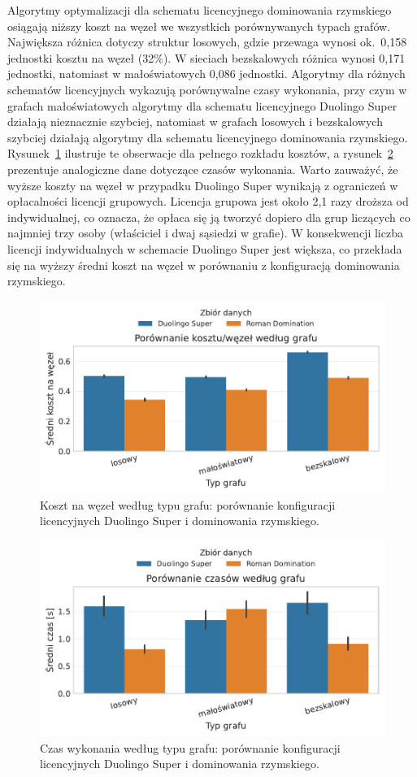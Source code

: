 Algorytmy optymalizacji dla schematu licencyjnego dominowania rzymskiego osiągają niższy koszt na węzeł we wszystkich porównywanych typach grafów. Największa różnica dotyczy struktur losowych, gdzie przewaga wynosi ok.~0{,}158 jednostki kosztu na węzeł (32\%). W sieciach bezskalowych różnica wynosi 0{,}171 jednostki, natomiast w małoświatowych 0{,}086 jednostki. Algorytmy dla różnych schematów licencyjnych wykazują porównywalne czasy wykonania, przy czym w grafach małoświatowych algorytmy dla schematu licencyjnego Duolingo Super działają nieznacznie szybciej, natomiast w grafach losowych i bezskalowych szybciej działają algorytmy dla schematu licencyjnego dominowania rzymskiego. Rysunek~\ref{fig:duo-roman-cost} ilustruje te obserwacje dla pełnego rozkładu kosztów, a rysunek~\ref{fig:duo-roman-time} prezentuje analogiczne dane dotyczące czasów wykonania. Warto zauważyć, że wyższe koszty na węzeł w przypadku Duolingo Super wynikają z ograniczeń w opłacalności licencji grupowych. Licencja grupowa jest około 2{,}1 razy droższa od indywidualnej, co oznacza, że opłaca się ją tworzyć dopiero dla grup liczących co najmniej trzy osoby (właściciel i dwaj sąsiedzi w grafie). W konsekwencji liczba licencji indywidualnych w schemacie Duolingo Super jest większa, co przekłada się na wyższy średni koszt na węzeł w porównaniu z konfiguracją dominowania rzymskiego.

\begin{figure}[H]
  \centering
  \includegraphics[width=0.6\linewidth]{assets/figures/benchmark/real/duo_vs_roman_cost_per_node_by_graph.pdf}
  \caption{Koszt na węzeł według typu grafu: porównanie konfiguracji licencyjnych Duolingo Super i dominowania rzymskiego.}
  \label{fig:duo-roman-cost}
\end{figure}

\begin{figure}[H]
  \centering
  \includegraphics[width=0.6\linewidth]{assets/figures/benchmark/real/duo_vs_roman_time_by_graph.pdf}
  \caption{Czas wykonania według typu grafu: porównanie konfiguracji licencyjnych Duolingo Super i dominowania rzymskiego.}
  \label{fig:duo-roman-time}
\end{figure}

